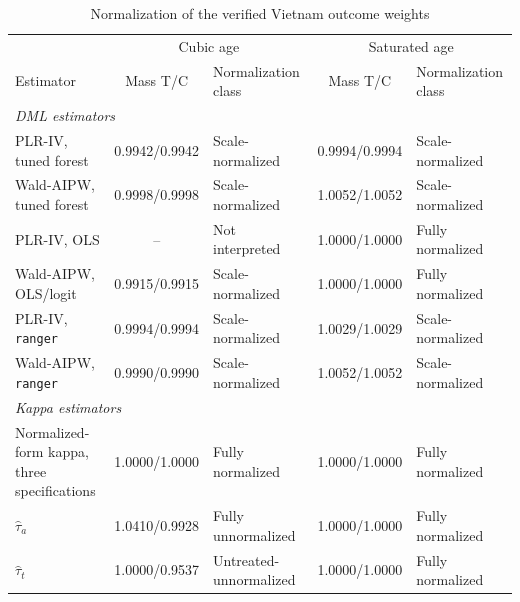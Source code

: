 \documentclass[12pt, a4paper, oneside]{article}
\theoremstyle{plain}
\theoremstyle{definition}
\begin{document}
\begin{table}[htbp]
\centering
\caption{Normalization of the verified Vietnam outcome weights}
\label{tab:vietnam_weight_normalization}
\scriptsize
\setlength{\tabcolsep}{3.5pt}
\renewcommand{\arraystretch}{1.02}
\begin{threeparttable}
\begin{tabular}{@{}lclcl@{}}
\toprule
& \multicolumn{2}{c}{Cubic age}
& \multicolumn{2}{c}{Saturated age} \\
\cmidrule(lr){2-3}\cmidrule(lr){4-5}
Estimator
& Mass T/C
& Normalization class
& Mass T/C
& Normalization class \\
\midrule

\multicolumn{5}{l}{\textit{DML estimators}} \\[1pt]

PLR-IV, tuned forest
& 0.9942/0.9942 & Scale-normalized
& 0.9994/0.9994 & Scale-normalized \\

Wald-AIPW, tuned forest
& 0.9998/0.9998 & Scale-normalized
& 1.0052/1.0052 & Scale-normalized \\

PLR-IV, OLS
& -- & Not interpreted
& 1.0000/1.0000 & Fully normalized \\

Wald-AIPW, OLS/logit
& 0.9915/0.9915 & Scale-normalized
& 1.0000/1.0000 & Fully normalized \\

PLR-IV, \texttt{ranger}
& 0.9994/0.9994 & Scale-normalized
& 1.0029/1.0029 & Scale-normalized \\

Wald-AIPW, \texttt{ranger}
& 0.9990/0.9990 & Scale-normalized
& 1.0052/1.0052 & Scale-normalized \\[3pt]

\multicolumn{5}{l}{\textit{Kappa estimators}} \\[1pt]

\shortstack[l]{Normalized-form kappa,\\three specifications}
& 1.0000/1.0000 & Fully normalized
& 1.0000/1.0000 & Fully normalized \\

$\widehat{\tau}_{a}$
& 1.0410/0.9928 & Fully unnormalized
& 1.0000/1.0000 & Fully normalized \\

$\widehat{\tau}_{t}$
& 1.0000/0.9537 & Untreated-unnormalized
& 1.0000/1.0000 & Fully normalized \\


\end{tabular}
\end{threeparttable}
\end{table}
\end{document}
